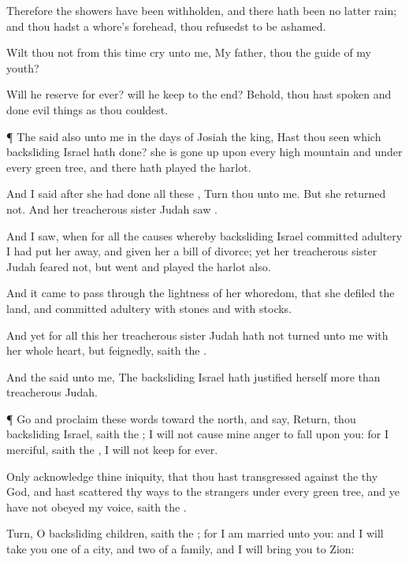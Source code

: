 {Therefore the
showers have been
withholden, and there hath been no latter
rain; and thou hadst a
whore’s
forehead, thou
refusedst to be
ashamed.

Wilt thou not from this time
cry unto me, My
father, thou
{} the
guide of my
youth?

Will he
reserve
{} for
ever? will he
keep
{} to the
end? Behold, thou hast
spoken and
done evil
things as thou
couldest.


\par }{\PP {}¶ The
{}
said also unto me in the
days of
Josiah the
king, Hast thou
seen
{} which
backsliding
Israel hath
done? she is gone
up upon every
high
mountain and
under every
green
tree, and there hath played the
harlot.

And I
said
after she had
done all these
{},
Turn thou unto me. But she
returned not. And her
treacherous
sister
Judah
saw
{}.

And I
saw, when for all the
causes whereby
backsliding
Israel committed
adultery I had put her
away, and
given her a
bill of
divorce; yet her
treacherous
sister
Judah
feared not, but
went and played the
harlot also.

And it came to pass through the
lightness of her
whoredom, that she
defiled the
land, and committed
adultery with
stones and with
stocks.

And yet for all this her
treacherous
sister
Judah hath not
turned unto me with her whole
heart, but
feignedly,
saith the
{}.

And the
{}
said unto me, The
backsliding
Israel hath
justified
herself more than
treacherous
Judah.


\par }{\PP {}¶
Go and
proclaim these
words toward the
north, and
say,
Return, thou
backsliding
Israel,
saith the
{};
{} I will not cause mine
anger to
fall upon you: for I
{}
merciful,
saith the
{},
{} I will not
keep
{} for
ever.

Only
acknowledge thine
iniquity, that thou hast
transgressed against the
{} thy
God, and hast
scattered thy
ways to the
strangers under every
green
tree, and ye have not
obeyed my
voice,
saith the
{}.

Turn, O
backsliding
children,
saith the
{}; for I am
married unto you: and I will
take you
one of a
city, and
two of a
family, and I will
bring you to
Zion:

}
